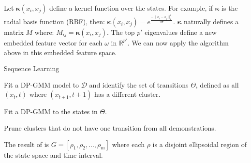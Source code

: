 Let $\mathbf{\kappa}(x_i,x_j)$ define a kernel function over the states.
For example, if $\mathbf{\kappa}$ is the radial basis function (RBF), then:
$ \mathbf{\kappa}(x_i,x_j) = e^{\frac{-\|x_i-x_j\|_2^2}{2\sigma}}$.
$\mathbf{\kappa}$ naturally defines a matrix $M$ where: $M_{ij} = \mathbf{\kappa}(x_i,x_j)$. 
The top $p'$ eigenvalues define a new embedded feature vector for each $\omega$ in $\mathbb{R}^{p'}$.
We can now apply the algorithm above in this embedded feature space.

\begin{phase}[t]
\small
\DontPrintSemicolon
\caption{Sequence Learning \label{alg:tsh1}}

Fit a DP-GMM model to $\mathcal{D}$ and identify the set of transitions $\Theta$, defined as all $(x_t,t)$  where  $(x_{t+1},t+1)$  has a different cluster.

Fit a DP-GMM to the states in $\Theta$.

Prune clusters that do not have one transition from all demonstrations.

The result of is $G = [\rho_1, \rho_2,...,\rho_m]$ where each $\rho$ is a disjoint ellipsoidal region of the state-space and time interval.

\end{phase}
